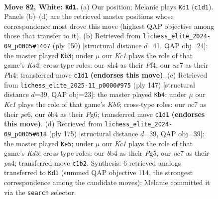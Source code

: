 \documentclass[11pt]{article}
\begin{document}
\clearpage

\begin{figure}[p]\centering
\begin{subfigure}{0.46\textwidth}\centering
\resizebox{\linewidth}{!}{%
\newchessgame
\chessboard[
  setfen={8/1Nn5/8/p7/Pb1pPk1n/1P1B3p/4P3/2K5 w - - 30 82},
  showmover=false,
  pgfstyle=straightmove, color=movearrow, markmove={c1-d1}
]}
\caption{}
\end{subfigure}\hfill
\begin{subfigure}{0.46\textwidth}\centering
\resizebox{\linewidth}{!}{%
\newchessgame
\chessboard[
  setfen={8/Pk6/6p1/5p1p/1p3P1P/2b3P1/K4B2/8 w - - 2 76},
  showmover=false,
  pgfstyle=straightmove, color=movearrow, markmove={a2-b3}
]}
\caption{}
\end{subfigure}
\\[4pt]
\begin{subfigure}{0.46\textwidth}\centering
\resizebox{\linewidth}{!}{%
\newchessgame
\chessboard[
  setfen={8/8/1p2P1p1/1Nb4p/5P1P/1k4P1/p7/K7 b - - 0 74},
  showmover=false,
  pgfstyle=straightmove, color=movearrow, markmove={b3-b4}
]}
\caption{}
\end{subfigure}\hfill
\begin{subfigure}{0.46\textwidth}\centering
\resizebox{\linewidth}{!}{%
\newchessgame
\chessboard[
  setfen={8/8/1K1k3p/p1p3p1/PbB3P1/4PP2/8/8 b - - 23 88},
  showmover=false,
  pgfstyle=straightmove, color=movearrow, markmove={d6-e5}
]}
\caption{}
\end{subfigure}
\caption{\textbf{Move 82, White: \texttt{Kd1}.} (a) Our position; Melanie plays \texttt{Kd1} (\texttt{c1d1}). Panels (b)--(d) are the retrieved master positions whose correspondence most drove this move (highest QAP objective among those that transfer to it). (b) Retrieved from \texttt{lichess\_elite\_2024-09\_p0005\#1407} (ply 150) [structural distance $d$=41, QAP obj=24]: the master played \texttt{Kb3}; under $\mu$ our \emph{Kc1} plays the role of that game's \emph{Ka2}; cross-type roles: our \emph{n}h4 as their \emph{P}f4, our \emph{n}c7 as their \emph{P}h4; transferred move \texttt{c1d1} \textbf{(endorses this move)}. (c) Retrieved from \texttt{lichess\_elite\_2025-11\_p0000\#975} (ply 147) [structural distance $d$=39, QAP obj=23]: the master played \texttt{Kb4}; under $\mu$ our \emph{Kc1} plays the role of that game's \emph{Kb6}; cross-type roles: our \emph{n}c7 as their \emph{p}e6, our \emph{b}b4 as their \emph{P}g6; transferred move \texttt{c1d1} \textbf{(endorses this move)}. (d) Retrieved from \texttt{lichess\_elite\_2024-09\_p0005\#618} (ply 175) [structural distance $d$=39, QAP obj=39]: the master played \texttt{Ke5}; under $\mu$ our \emph{Kc1} plays the role of that game's \emph{Kd3}; cross-type roles: our \emph{b}b4 as their \emph{P}g5, our \emph{n}c7 as their \emph{p}a4; transferred move \texttt{c1b2}. Synthesis: 6 retrieved analogs transferred to \texttt{Kd1} (summed QAP objective 114, the strongest correspondence among the candidate moves); Melanie committed it via the \texttt{search} selector.}
\label{fig:thought-m162}
\end{figure}
\end{document}
